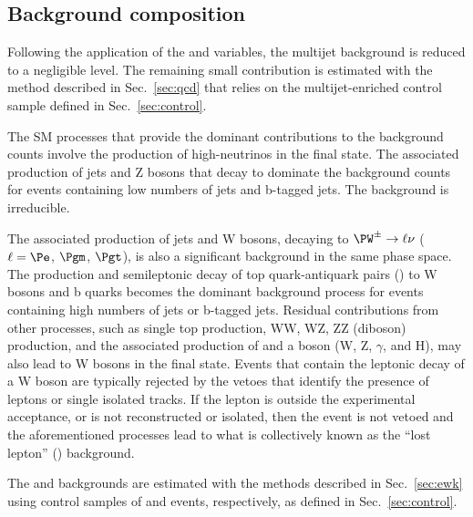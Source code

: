
\subsection{Background composition}
\label{sec:bkgd}

Following the application of the \alphat and \bdphi variables, the
multijet background is reduced to a negligible level. The remaining
small contribution is estimated with the method described in
Sec.~\ref{sec:qcd} that relies on the multijet-enriched control sample
defined in Sec.~\ref{sec:control}.

The SM processes that provide the dominant contributions to the
background counts involve the production of high-\pt neutrinos in the
final state. The associated production of jets and Z bosons that decay
to \znunu dominate the background counts for events containing low
numbers of jets and b-tagged jets. The \znunuj background is
irreducible. 

The associated production of jets and W bosons, decaying to $\PW^\pm
\to \ell\nu$ ($\ell=\Pe$, $\Pgm$, $\Pgt$), is also a significant
background in the same phase space. The production and semileptonic
decay of top quark-antiquark pairs (\ttbar) to W bosons and b quarks
becomes the dominant background process for events containing high
numbers of jets or b-tagged jets. Residual contributions from other
processes, such as single top production, WW, WZ, ZZ (diboson)
production, and the associated production of \ttbar and a boson
({\ttbar}W, {\ttbar}Z, {\ttbar}$\gamma$, and {\ttbar}H), may also lead
to W bosons in the final state. Events that contain the leptonic decay
of a W boson are typically rejected by the vetoes that identify the
presence of leptons or single isolated tracks. If the lepton is
outside the experimental acceptance, or is not reconstructed or
isolated, then the event is not vetoed and the aforementioned
processes lead to what is collectively known as the ``lost lepton''
(\lost) background.

The \lost and \znunuj backgrounds are estimated with the methods
described in Sec.~\ref{sec:ewk} using control samples of \mj and \mmj
events, respectively, as defined in Sec.~\ref{sec:control}.


